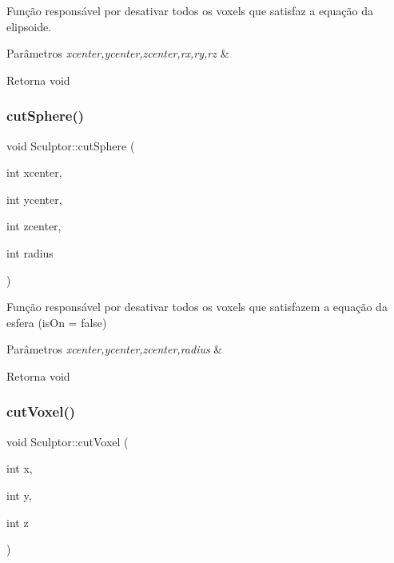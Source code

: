 Função responsável por desativar todos os voxels que satisfaz a equação da elipsoide. 


\begin{DoxyParams}{Parâmetros}
{\em xcenter,ycenter,zcenter,rx,ry,rz} & \\
\hline
\end{DoxyParams}
\begin{DoxyReturn}{Retorna}
void 
\end{DoxyReturn}
\mbox{\label{class_sculptor_a67ab8c0ba5116adb8af1d01ad373ac15}} 
\subsubsection{\texorpdfstring{cut\+Sphere()}{cutSphere()}}
{\footnotesize\ttfamily void Sculptor\+::cut\+Sphere (\begin{DoxyParamCaption}\item[{int}]{xcenter,  }\item[{int}]{ycenter,  }\item[{int}]{zcenter,  }\item[{int}]{radius }\end{DoxyParamCaption})}



Função responsável por desativar todos os voxels que satisfazem a equação da esfera (is\+On = false) 


\begin{DoxyParams}{Parâmetros}
{\em xcenter,ycenter,zcenter,radius} & \\
\hline
\end{DoxyParams}
\begin{DoxyReturn}{Retorna}
void 
\end{DoxyReturn}
\mbox{\label{class_sculptor_ad9d714a35fc8ae16d06eb5df37c3493c}} 
\subsubsection{\texorpdfstring{cut\+Voxel()}{cutVoxel()}}
{\footnotesize\ttfamily void Sculptor\+::cut\+Voxel (\begin{DoxyParamCaption}\item[{int}]{x,  }\item[{int}]{y,  }\item[{int}]{z }\end{DoxyParamCaption})}



